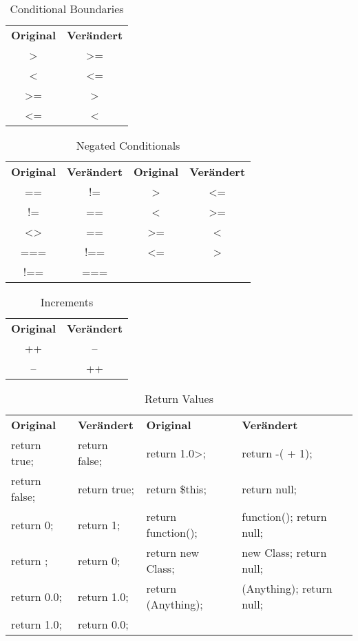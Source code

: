 \begin{table}[H]
	\caption{Conditional Boundaries}
	\begin{tabular}{cc}
		\textbf{Original} & \textbf{Verändert} \\
		> & >= \\
		< & <= \\
		>= & > \\
		<= & < \\
	\end{tabular}
\end{table}

\begin{table}[H]
	\caption{Negated Conditionals}
	\begin{tabular}{cccc}
		\textbf{Original} & \textbf{Verändert} & \textbf{Original} & \textbf{Verändert} \\
		== & != & > & <= \\
		!= & == & < & >= \\
        <> & == & >= & < \\
	    === & !== & <= & > \\
        !== & === &  &  \\
	\end{tabular}
\end{table}

\begin{table}[H]
	\caption{Increments}
	\begin{tabular}{cc}
		\textbf{Original} & \textbf{Verändert} \\%
		++ & -- \\
		-- & ++ \\
	\end{tabular}
\end{table}

\begin{table}[H]
	\caption{Return Values}
	\begin{tabular}{llll}
		\textbf{Original} & \textbf{Verändert} & \textbf{Original} & \textbf{Verändert} \\
		return true; & return false; & return 1.0>; & return -( + 1); \\
		return false; & return true; & return \$this; & return null; \\
		return 0; & return 1; & return function(); & function(); return null; \\
		return ; & return 0; & return new Class; & new Class; return null; \\
		return 0.0; & return 1.0; & return (Anything); & (Anything); return null; \\
		return 1.0; & return 0.0; & & \\
	\end{tabular}
\end{table}

